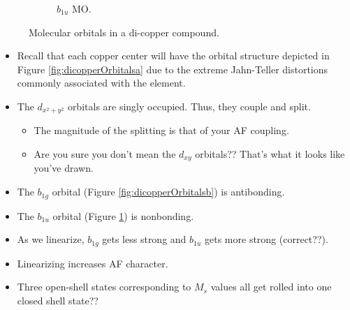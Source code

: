 \documentclass[../notes.tex]{subfiles}
\begin{document}
\begin{itemize}
\begin{figure}[h!]
\begin{subfigure}[b]{0.3\linewidth}
            \caption{$b_{1u}$ MO.}
            \label{fig:dicopperOrbitalsc}
        \end{subfigure}
        \caption{Molecular orbitals in a di-copper compound.}
        \label{fig:dicopperOrbitals}
    \end{figure}
    \begin{itemize}
        \item Recall that each copper center will have the orbital structure depicted in Figure \ref{fig:dicopperOrbitalsa} due to the extreme Jahn-Teller distortions commonly associated with the element.
        \item The $d_{x^2+y^2}$ orbitals are singly occupied. Thus, they couple and split.
        \begin{itemize}
            \item The magnitude of the splitting is that of your AF coupling.
            \item Are you sure you don't mean the $d_{xy}$ orbitals?? That's what it looks like you've drawn.
        \end{itemize}
        \item The $b_{1g}$ orbital (Figure \ref{fig:dicopperOrbitalsb}) is antibonding.
        \item The $b_{1u}$ orbital (Figure \ref{fig:dicopperOrbitalsc}) is nonbonding.
        \item As we linearize, $b_{1g}$ gets less strong and $b_{1u}$ gets more strong (correct??).
        \item Linearizing increases AF character.
        \item Three open-shell states corresponding to $M_s$ values all get rolled into one closed shell state??

\end{itemize}
\end{itemize}
\end{document}
